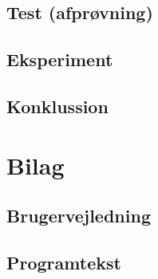 \documentclass[a4paper]{report}
\begin{document}
\subsection*{Test (afprøvning)}

\subsection*{Eksperiment}

\subsection*{Konklussion}

\newpage
\section*{Bilag}

\subsection*{Brugervejledning}

\subsection*{Programtekst}
\end{document}
